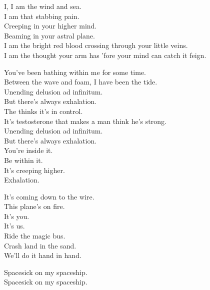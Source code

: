 
I, I am the wind and sea. \\
I am that stabbing pain. \\
Creeping in your higher mind. \\
Beaming in your astral plane. \\
I am the bright red blood crossing through your little veins. \\
I am the thought your arm has 'fore your mind can catch it feign. \\


You've been bathing within me for some time. \\
Between the wave and foam, I have been the tide. \\
Unending delusion ad infinitum. \\
But there's always exhalation. \\
The  thinks it's in control. \\
It's testosterone that makes a man think he's strong. \\
Unending delusion ad infinitum. \\
But there's always exhalation. \\

You're inside it. \\
Be within it. \\
It's creeping higher. \\
Exhalation. \\


It's coming down to the wire. \\
This plane's on fire. \\
It's you. \\
It's us. \\
Ride the magic bus. \\
Crash land in the sand. \\
We'll do it hand in hand. \\





Spacesick on my spaceship. \\
Spacesick on my spaceship. \\

